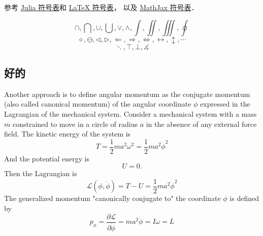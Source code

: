 
参考 \href{https://docs.julialang.org/en/v1/manual/unicode-input/}{Julia 符号表}和 \href{https://oeis.org/wiki/List_of_LaTeX_mathematical_symbols}{LaTeX 符号表}， 以及 \href{http://www.onemathematicalcat.org/MathJaxDocumentation/TeXSyntax.htm#U}{MathJax 符号表}．

\begin{equation}
\cap, \bigcap, \cup, \bigcup, \vee, \wedge, \int, \iint, \iiint, \oint
\end{equation}
\begin{equation}
\diamond, \ominus, \triangleleft, \triangleright, \Longleftarrow, \Longrightarrow, \iff, \leftrightarrow, \updownarrow, \cdots
\end{equation}
\begin{equation}
\ddots, \top, \bot, \measuredangle
\end{equation}

\subsection{好的}

Another approach is to define angular momentum as the conjugate momentum (also called canonical momentum) of the angular coordinate $\phi$ expressed in the Lagrangian of the mechanical system. Consider a mechanical system with a mass $m$ constrained to move in a circle of radius $a$ in the absence of any external force field. The kinetic energy of the system is
$$
T=\frac{1}{2} m a^{2} \omega^{2}=\frac{1}{2} m a^{2} \dot{\phi}^{2}
$$
And the potential energy is
$$
U=0 .
$$
Then the Lagrangian is
$$
\mathcal{L}(\phi, \dot{\phi})=T-U=\frac{1}{2} m a^{2} \dot{\phi}^{2}
$$
The generalized momentum "canonically conjugate to" the coordinate $\phi$ is defined by
$$
p_{\phi}=\frac{\partial \mathcal{L}}{\partial \dot{\phi}}=m a^{2} \dot{\phi}=I \omega=L
$$
